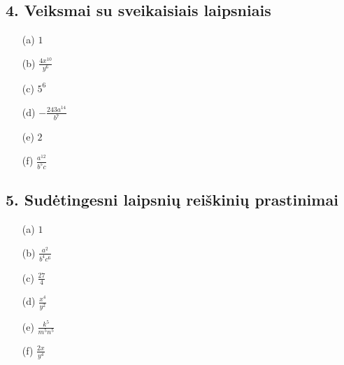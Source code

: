 \documentclass[12pt, a4paper]{article}
\begin{document}
\subsection*{4. Veiksmai su sveikaisiais laipsniais}
\begin{multicols}{2}
\begin{enumerate}
    \item[(a)] $1$
    \item[(b)] $\frac{4x^{10}}{y^6}$
    \item[(c)] $5^6$
    \item[(d)] $-\frac{243a^{14}}{b^7}$
    \item[(e)] $2$
    \item[(f)] $\frac{a^{12}}{b^5 c}$
\end{enumerate}
\end{multicols}

\subsection*{5. Sudėtingesni laipsnių reiškinių prastinimai}
\begin{multicols}{2}
\begin{enumerate}
    \item[(a)] $1$
    \item[(b)] $\frac{a^2}{b^4 c^6}$
    \item[(c)] $\frac{27}{4}$
    \item[(d)] $\frac{x^4}{y^2}$
    \item[(e)] $\frac{k^5}{m^5 n^5}$
    \item[(f)] $\frac{2x}{y^4}$
\end{enumerate}
\end{multicols}
\end{document}
